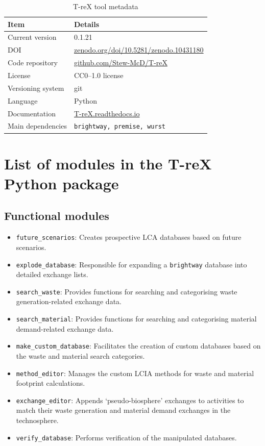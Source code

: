 \documentclass{article}
\renewcommand{\texttt}[1]{{\ttfamily\small\nolinkurl{#1}}}
\begin{document}
\begin{table}[h]
    \caption{T-reX tool metadata}\label{tab:metadata}
    \centering
    \begin{tabular}{ll}
        \toprule
        \textbf{Item}     & \textbf{Details}                             \\
        \midrule
        Current version   & 0.1.21                                       \\
        DOI               & \url{zenodo.org/doi/10.5281/zenodo.10431180} \\
        Code repository   & \url{github.com/Stew-McD/T-reX}              \\
        License           & CC0--1.0 license                             \\
        Versioning system & git                                          \\
        Language          & Python                                       \\
        Documentation     & \url{T-reX.readthedocs.io}                   \\
        Main dependencies & \texttt{brightway, premise, wurst}           \\
        \bottomrule
    \end{tabular}
\end{table}

\section{List of modules in the T-reX Python package}

\subsection{Functional modules}
\begin{itemize}
    \item \texttt{future\_scenarios}: Creates prospective LCA databases based on future scenarios.
    \item \texttt{explode\_database}: Responsible for expanding a \texttt{brightway} database into detailed exchange lists.
    \item \texttt{search\_waste}: Provides functions for searching and categorising waste generation-related exchange data.
    \item \texttt{search\_material}: Provides functions for searching and categorising material demand-related exchange data.
    \item \texttt{make\_custom\_database}: Facilitates the creation of custom databases based on the waste and material search categories.
    \item \texttt{method\_editor}: Manages the custom LCIA methods for waste and material footprint calculations.
    \item \texttt{exchange\_editor}: Appends `pseudo-biosphere' exchanges to activities to match their waste generation and material demand exchanges in the technosphere.
    \item \texttt{verify\_database}: Performs verification of the manipulated databases.
\end{itemize}
\end{document}
